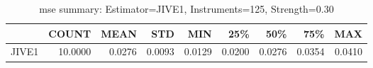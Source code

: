 \begin{table}[ht]
\centering
\caption{mse summary: Estimator=JIVE1, Instruments=125, Strength=0.30}
\begin{tabular}{lrrrrrrrr}
\toprule
 & COUNT & MEAN & STD & MIN & 25\% & 50\% & 75\% & MAX \\
\midrule
JIVE1 & 10.0000 & 0.0276 & 0.0093 & 0.0129 & 0.0200 & 0.0276 & 0.0354 & 0.0410 \\
\bottomrule
\end{tabular}
\end{table}
